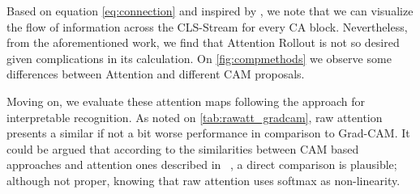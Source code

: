 Based on equation \ref{eq:connection} and inspired by \cite{abnar2020quantifying}, we note that we can visualize the flow of information across the CLS-Stream for every CA block. Nevertheless, from the aforementioned work, we find that Attention Rollout is not so desired given complications in its calculation. On \autoref{fig:compmethods} we observe some differences between Attention and different CAM proposals. %


Moving on, we evaluate these attention maps following the approach for interpretable recognition. As noted on \autoref{tab:rawatt_gradcam}, raw attention presents a similar if not a bit worse performance in comparison to Grad-CAM. It could be argued that according to the similarities between CAM based approaches and attention ones described in ~, a direct comparison is plausible; although not proper, knowing that raw attention uses softmax as non-linearity.

